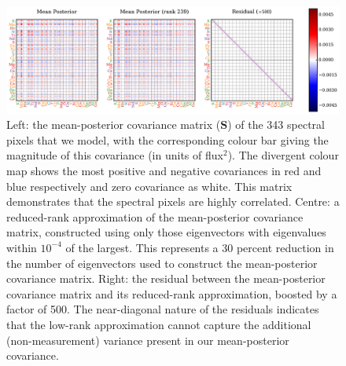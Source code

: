 \documentclass[a4paper,fleqn,usenatbib]{mnras}
\newcommand{\speccov}{{\bm S}}
\begin{document}
\begin{figure}
	\includegraphics[width=2\columnwidth]{apogee_centers_final_29502_spc_win_wid_1p5_low_rank_covariance.pdf}
    \caption{Left: the mean-posterior covariance matrix ($\speccov$) of the 343 spectral pixels that we model, with the corresponding colour bar giving the magnitude of this covariance (in units of flux$^2$). The divergent colour map shows the most positive and negative covariances in red and blue respectively and zero covariance as white. This matrix demonstrates that the spectral pixels are highly correlated. Centre: a reduced-rank approximation of the mean-posterior covariance matrix, constructed using only those eigenvectors with eigenvalues within $10^{-4}$ of the largest. This represents a 30 percent reduction in the number of eigenvectors used to construct the mean-posterior covariance matrix. Right: the residual between the mean-posterior covariance matrix and its reduced-rank approximation, boosted by a factor of 500. The near-diagonal nature of the residuals indicates that the low-rank approximation cannot capture the additional (non-measurement) variance present in our mean-posterior covariance.}
    \label{fig:inferred_cov}
\end{figure}
\end{document}
